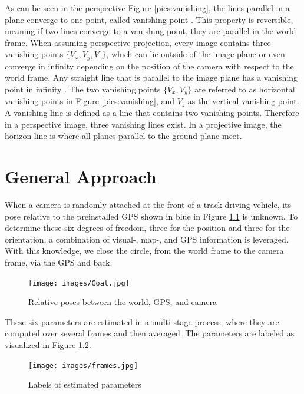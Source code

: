  As can be seen in the perspective Figure \ref{pics:vanishing}, the lines parallel in a plane converge to one point, called vanishing point \citep{caprile1990using}. This property is reversible, meaning if two lines converge to a vanishing point, they are parallel in the world frame. 
When assuming perspective projection, every image contains three vanishing points $\{V_x, V_y, V_z \}$, which can lie outside of the image plane or even converge in infinity depending on the position of the camera with respect to the world frame. Any straight line that is parallel to the image plane has a vanishing point in infinity \citep{liu2010viewing}. The two vanishing points $\{V_x, V_y \}$ are referred to as horizontal vanishing points in Figure \ref{pics:vanishing}, and $V_z$ as the vertical vanishing point. A vanishing line is defined as a line that contains two vanishing points. Therefore in a perspective image, three vanishing lines exist. In a projective image, the horizon line is where all planes parallel to the ground plane meet. 







\chapter{General Approach } \label{sec:general_approach}
When a camera is randomly attached at the front of a track driving vehicle, its pose relative to the preinstalled GPS shown in blue in Figure \ref{pics:goal} is unknown. To determine these six degrees of freedom, three for the position and three for the orientation, a combination of visual-, map-, and GPS information is leveraged. With this knowledge, we close the circle, from the world frame to the camera frame, via the GPS and back.

\begin{figure}[h!]
   \centering
   \texttt{[image: images/Goal.jpg]}
   \caption{Relative poses between the world, GPS, and camera}
   \label{pics:goal}
\end{figure}

These six parameters are estimated in a multi-stage process, where they are computed over several frames and then averaged. The parameters are labeled as visualized in Figure \ref{pics:frame}. 

\begin{figure}[h!]
   \centering
   \texttt{[image: images/frames.jpg]}
   \caption{Labels of estimated parameters}
   \label{pics:frame}
\end{figure}


